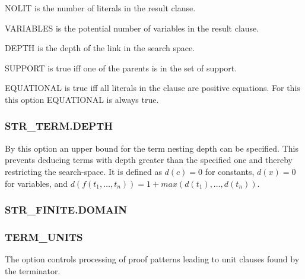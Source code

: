 NOLIT is the number of literals in the result clause.

VARIABLES is the potential number of variables in the result clause.

DEPTH is the depth of the link in the search space.

SUPPORT is true iff one of
the parents is in the set of support.

EQUATIONAL is true iff all literals in the clause are positive
equations. For this this option EQUATIONAL is always true.

\PO  
{}


\subsubsection{STR\_TERM.DEPTH}
  

By this option an upper bound for the term nesting depth can be specified. 
This prevents deducing terms with depth greater than the specified one 
and thereby restricting  the search-space. It is defined as $d(c) = 0$
for constants, $d(x) = 0$ for variables, and $d(f(t_1,\dots ,t_n)) =
1+ max(d(t_1),\dots ,d(t_n))$.

\PO
{}

\subsubsection{STR\_FINITE.DOMAIN}
   

\PO
{}


\subsubsection{TERM\_UNITS}
  
\label{termunits}

The option controls processing of proof patterns leading to unit
clauses found by the terminator.


